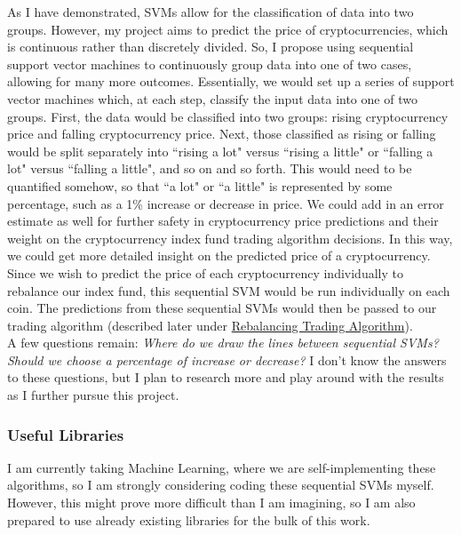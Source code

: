 \documentclass{article}
\begin{document}
As I have demonstrated, SVMs allow for the classification of data into two groups. However, my project aims to predict the price of cryptocurrencies, which is continuous rather than discretely divided. So, I propose using sequential support vector machines to continuously group data into one of two cases, allowing for many more outcomes. Essentially, we would set up a series of support vector machines which, at each step, classify the input data into one of two groups. First, the data would be classified into two groups: rising cryptocurrency price and falling cryptocurrency price. Next, those classified as rising or falling would be split separately into ``rising a lot" versus ``rising a little" or ``falling a lot" versus ``falling a little", and so on and so forth. This would need to be quantified somehow, so that ``a lot" or ``a little" is represented by some percentage, such as a 1\% increase or decrease in price. We could add in an error estimate as well for further safety in cryptocurrency price predictions and their weight on the cryptocurrency index fund trading algorithm decisions. In this way, we could get more detailed insight on the predicted price of a cryptocurrency. \\

Since we wish to predict the price of each cryptocurrency individually to rebalance our index fund, this sequential SVM would be run individually on each coin. The predictions from these sequential SVMs would then be passed to our trading algorithm (described later under \hyperref[sec:rebalancing]{Rebalancing Trading Algorithm}). \\

A few questions remain: \textit{Where do we draw the lines between sequential SVMs? Should we choose a percentage of increase or decrease?} I don't know the answers to these questions, but I plan to research more and play around with the results as I further pursue this project.


\subsubsection{Useful Libraries}
\label{sec:sequentialSVMlibraries}

I am currently taking Machine Learning, where we are self-implementing these algorithms, so I am strongly considering coding these sequential SVMs myself. However, this might prove more difficult than I am imagining, so I am also prepared to use already existing libraries for the bulk of this work. \\
\end{document}
